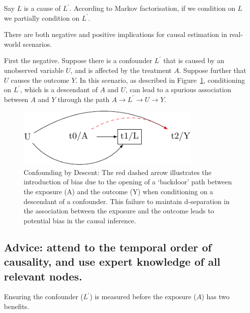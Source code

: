 \documentclass[
  singlecolumn]{report}
\begin{document}
Say \(L\) is a cause of \(L^\prime\). According to Markov factorisation,
if we condition on \(L\) we partially condition on \(L^\prime\).

There are both negative and positive implications for causal estimation
in real-world scenarios.

First the negative. Suppose there is a confounder \(L^\prime\) that is
caused by an unobserved variable \(U\), and is affected by the treatment
\(A\). Suppose further that \(U\) causes the outcome \(Y\). In this
scenario, as described in Figure~\ref{fig-dag-descendent}, conditioning
on \(L^\prime\), which is a descendant of \(A\) and \(U\), can lead to a
spurious association between \(A\) and \(Y\) through the path
\(A \to L^\prime \to U \to Y\).

\begin{figure}

{\centering \includegraphics[width=0.8\textwidth,height=\textheight]{causal-dags_files/figure-pdf/fig-dag-descendent-1.pdf}

}

\caption{\label{fig-dag-descendent}Confounding by Descent: The red
dashed arrow illustrates the introduction of bias due to the opening of
a `backdoor' path between the exposure (A) and the outcome (Y) when
conditioning on a descendant of a confounder. This failure to maintain
d-separation in the association between the exposure and the outcome
leads to potential bias in the causal inference.}

\end{figure}

\hypertarget{advice-attend-to-the-temporal-order-of-causality-and-use-expert-knowledge-of-all-relevant-nodes.}{%
\subsection{Advice: attend to the temporal order of causality, and use
expert knowledge of all relevant
nodes.}\label{advice-attend-to-the-temporal-order-of-causality-and-use-expert-knowledge-of-all-relevant-nodes.}}

Ensuring the confounder (\(L^\prime\)) is measured before the exposure
(\(A\)) has two benefits.
\end{document}
